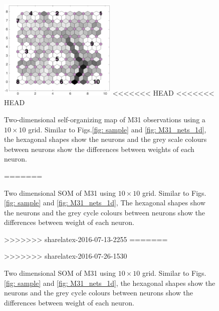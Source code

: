\begin{figure}
        \centering
        \includegraphics[width=0.5\textwidth]{../../images0.01/M31/2D/diff_dimension/combine_2D_data_between_cols3and26.png}
<<<<<<< HEAD
<<<<<<< HEAD
    \caption{Two-dimensional self-organizing map of M31 observations using a $10\times10$ grid. Similar to Figs.\ref{fig: sample} and \ref{fig: M31_nets_1d}, the hexagonal shapes show the neurons and the grey scale colours between neurons show the differences between weights of each neuron.}
=======
    \caption{Two dimensional SOM of M31 using $10\times10$ grid. Similar to Figs.\ref{fig: sample} and \ref{fig: M31_nets_1d}, The hexagonal shapes show the neurons and the grey cycle colours between neurons show the differences between weight of each neuron.}
>>>>>>> sharelatex-2016-07-13-2255
=======
    \caption{Two dimensional SOM of M31 using $10\times10$ grid. Similar to Figs.\ref{fig: sample} and \ref{fig: M31_nets_1d}, the hexagonal shapes show the neurons and the grey cycle colours between neurons show the differences between weight of each neuron.}
>>>>>>> sharelatex-2016-07-26-1530
    \label{fig: all_derived_ones}
\end{figure}
